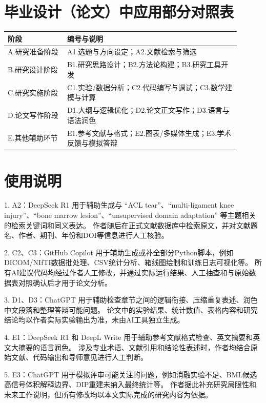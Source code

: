 \section{毕业设计（论文）中应用部分对照表}
\begingroup
\small
\setlength{\tabcolsep}{5pt}
\renewcommand{\arraystretch}{1.16}
\begin{longtable}{>{\raggedright\arraybackslash}p{0.23\linewidth}
                  >{\raggedright\arraybackslash}p{0.67\linewidth}}
  \toprule
  阶段 & 编号与说明 \\
  \midrule
  A.研究准备阶段 & A1.选题与方向设定；A2.文献检索与筛选 \\
  B.研究设计阶段 & B1.研究思路设计；B2.方法论构建；B3.研究工具开发 \\
  C.研究实施阶段 & C1.实验/数据分析；C2.代码编写与调试；C3.数学建模与计算 \\
  D.论文写作阶段 & D1.大纲与逻辑优化；D2.论文正文写作；D3.语言与语法润色 \\
  E.其他辅助环节 & E1.参考文献与格式；E2.图表/多媒体生成；E3.学术反馈与模拟答辩 \\
  \bottomrule
\end{longtable}
\endgroup

\section{使用说明}
1. A2：DeepSeek R1 用于辅助生成与 ``ACL tear''、``multi-ligament knee injury''、``bone marrow lesion''、``unsupervised domain adaptation'' 等主题相关的检索关键词和同义表达。
作者随后在正式文献数据库中检索原文，并对文献题名、作者、期刊、年份和DOI等信息进行人工核验。

2. C2、C3：GitHub Copilot 用于辅助生成或补全部分Python脚本，例如DICOM/NIfTI数据批处理、CSV统计分析、箱线图绘制和训练日志可视化等。
所有AI建议代码均经过作者人工修改，并通过实际运行结果、人工抽查和与原始数据表对照确认后才用于论文分析。

3. D1、D3：ChatGPT 用于辅助检查章节之间的逻辑衔接、压缩重复表述、润色中文段落和整理答辩可能问题。
论文中的实验结果、统计数值、表格内容和研究结论均以作者实际实验输出为准，未由AI工具独立生成。

4. E1：DeepSeek R1 和 DeepL Write 用于辅助参考文献格式检查、英文摘要和英文大摘要的语言润色。
涉及专业术语、文献引用和结论性表述时，作者均结合原始文献、代码输出和导师意见进行人工判断。

5. E3：ChatGPT 用于模拟评审可能关注的问题，例如消融实验不足、BML候选高信号体积解释边界、DIP重建未纳入最终统计等。
作者据此补充研究局限性和未来工作说明，但所有修改均以本文实际完成的研究内容为依据。
